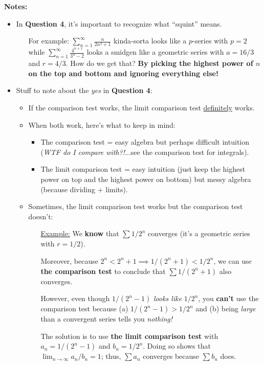 \documentclass[12pt]{article}
\newcommand{\sectitle}[1]{\noindent\hspace{-0.375in}\textbf{\Large{#1:}}\\}
\newcommand{\shortlim}{\lim_{n\to\infty}}
\newcommand{\infsum}[3]{\sum_{{#1}={#2}}^\infty {#3}}
\begin{document}
\sectitle{Notes}
	\begin{itemize}[leftmargin=0in,itemsep=4.5mm,label=$\dagger$]
		\item In \textbf{Question 4}, it's important to recognize what ``squint'' means.
		\begin{itemize}[leftmargin=0.125in]
			\item[] For example: $\textstyle\infsum{n}{1}{\frac{n}{2n^3+1}}$ kinda-sorta looks like a $p$-series with $p=2$ while $\textstyle\infsum{n}{1}{\frac{4^{n+1}}{3^n-2}}$ looks a smidgen like a geometric series with $a=16/3$ and $r=4/3$. How do we get that? \textbf{By picking the highest power of $n$ on the top and bottom and ignoring everything else!}
		\end{itemize}
		\item Stuff to note about the \textit{yes} in \textbf{Question 4}:
		\begin{itemize}
			\item If the comparison test works, the limit comparison test \ul{definitely} works.
			\item When both work, here's what to keep in mind:
			\begin{itemize}[label=$\circ$,topsep=0mm]
				\item The comparison test = easy algebra but perhaps difficult intuition (\textit{WTF do I compare with?!}...see the comparison test for integrals).
				\item The limit comparison test = easy intuition (just keep the highest power on top and the highest power on bottom) but messy algebra (because dividing + limits).
			\end{itemize}
			\item Sometimes, the limit comparison test works but the comparison test doesn't:
			\begin{itemize}[leftmargin=1in,topsep=0mm, itemsep=2mm]
				\item[\ul{Example:}] We \textbf{know} that $\sum 1/2^n$ converges (it's a geometric series with $r=1/2$). 
				\item[]Moreover, because $2^n < 2^n+1\implies 1/(2^n+1) < 1/2^n$, we can use \textbf{the comparison test} to conclude that $\sum 1/(2^n+1)$ also converges.
				\item[]However, even though $1/(2^n-1)$ \textit{looks like} $1/2^n$, you \textbf{can't} use the comparison test because (a) $1/(2^n-1)>1/2^n$ and (b) being \textit{large} than a convergent series tells you \textit{nothing!}
				\item[]The solution is to use \textbf{the limit comparison test} with $a_n=1/(2^n-1)$ and $b_n=1/2^n$. Doing so shows that $\shortlim{a_n/b_n}=1$; thus, $\sum a_n$ converges because $\sum b_n$ does.
			\end{itemize}
		\end{itemize}
	\end{itemize}
\end{document}
